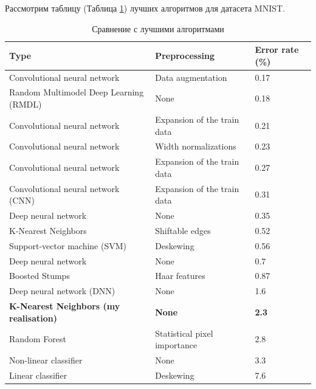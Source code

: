 \documentclass[12pt,fleqn]{article}
\begin{document}
Рассмотрим таблицу (Таблица \ref{table2}) лучших алгоритмов для датасета MNIST.
\begin{table}[htb]
    \centering
    \begin{tabular}{|l|l|l|}
    \hline
    Type                                          & Preprocessing                       & Error rate (\%) \\ \hline
    Convolutional neural network                  & Data augmentation                   & 0.17            \\ \hline
    Random Multimodel Deep Learning (RMDL)        & None                                & 0.18            \\ \hline
    Convolutional neural network                  & Expansion of the train data      & 0.21            \\ \hline
    Convolutional neural network                  & Width normalizations                & 0.23            \\ \hline
    Convolutional neural network                  & Expansion of the train data      & 0.27            \\ \hline
    Convolutional neural network (CNN)            & Expansion of the train data      & 0.31            \\ \hline
    Deep neural network                           & None                                & 0.35            \\ \hline
    K-Nearest Neighbors                           & Shiftable edges                     & 0.52            \\ \hline
    Support-vector machine (SVM)                  & Deskewing                           & 0.56            \\ \hline
    Deep neural network                           & None                                & 0.7             \\ \hline
    Boosted Stumps                                & Haar features                       & 0.87            \\ \hline
    Deep neural network (DNN)                     & None                                & 1.6             \\ \hline
    \textbf{K-Nearest Neighbors (my realisation)} & \textbf{None}                       & \textbf{2.3}    \\ \hline
    Random Forest                                 & Statistical pixel importance        & 2.8             \\ \hline
    Non-linear classifier                         & None                                & 3.3             \\ \hline
    Linear classifier                             & Deskewing                           & 7.6             \\ \hline
    \end{tabular}
    \caption{Сравнение с лучшими алгоритмами}
    \label{table2}
\end{table}
\end{document}
